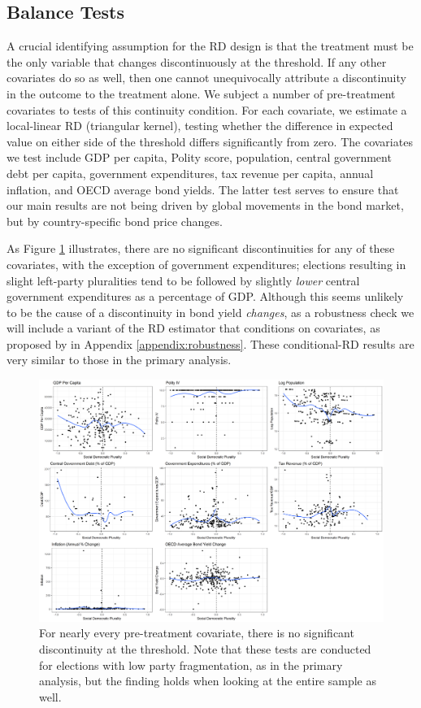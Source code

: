 \documentclass[12pt]{article}
\begin{document}
\subsection{Balance Tests}

A crucial identifying assumption for the RD design is that the treatment must be the only variable that changes discontinuously at the threshold. If any other covariates do so as well, then one cannot unequivocally attribute a discontinuity in the outcome to the treatment alone. We subject a number of pre-treatment covariates to tests of this continuity condition. For each covariate, we estimate a local-linear RD (triangular kernel), testing whether the difference in expected value on either side of the threshold differs significantly from zero. The covariates we test include GDP per capita, Polity score, population, central government debt per capita, government expenditures, tax revenue per capita, annual inflation, and OECD average bond yields. The latter test serves to ensure that our main results are not being driven by global movements in the bond market, but by country-specific bond price changes. 

As Figure \ref{fig:balanceplots} illustrates, there are no significant discontinuities for any of these covariates, with the exception of government expenditures; elections resulting in slight left-party pluralities tend to be followed by slightly \textit{lower} central government expenditures as a percentage of GDP. Although this seems unlikely to be the cause of a discontinuity in bond yield \textit{changes}, as a robustness check we will include a variant of the RD estimator that conditions on covariates, as proposed by \citet{Calonico2018} in Appendix \ref{appendix:robustness}. These conditional-RD results are very similar to those in the primary analysis.

\begin{figure}
\centering
\includegraphics[width=\linewidth]{Figures/balancePlots}
\caption{For nearly every pre-treatment covariate, there is no significant discontinuity at the threshold. Note that these tests are conducted for elections with low party fragmentation, as in the primary analysis, but the finding holds when looking at the entire sample as well.}
\label{fig:balanceplots}
\end{figure}
\end{document}

